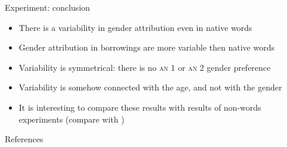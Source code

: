 \documentclass[13pt, t]{beamer}
\begin{document}

\begin{frame}{Experiment: conclusion}
\begin{itemize}
\item There is a variability in gender attribution even in native words
\item Gender attribution in borrowings are more variable then native words
\item Variability is symmetrical: there is no \textsc{an} 1 or \textsc{an} 2 gender preference
\item Variability is somehow connected with the age, and not with the gender \pause
\item It is interesting to compare these results with results of non-words experiments (compare with \citep{dabrowska05})
\end{itemize}
\end{frame}


\begin{frame}{References}
\footnotesize


\end{frame}
\end{document}
